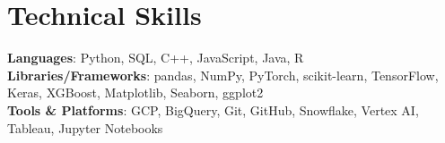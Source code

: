 \documentclass[letterpaper,11pt]{article}
\begin{document}
\section{Technical Skills}
 \begin{itemize}[leftmargin=0in, label={}]
    \small{\item{
     \textbf{Languages}{: Python, SQL, C++, JavaScript, Java, R} \\
     \textbf{Libraries/Frameworks}{: pandas, NumPy, PyTorch, scikit-learn, TensorFlow, Keras, XGBoost, Matplotlib, Seaborn, ggplot2} \\
     \textbf{Tools \& Platforms}{: GCP, BigQuery, Git, GitHub, Snowflake, Vertex AI, Tableau, Jupyter Notebooks}
    }}
 \end{itemize}
\end{document}
